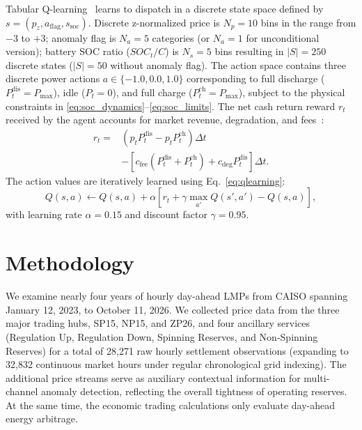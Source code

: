 \documentclass[journal]{IEEEtran}
\begin{document}
Tabular Q-learning~\cite{Sutton_RL} learns to dispatch in a discrete state space defined by $s=(p_z, a_{\text{flag}}, s_{\text{soc}})$. Discrete z-normalized price is $N_p=10$ bins in the range from $-3$ to $+3$; anomaly flag is $N_a=5$ categories (or $N_a=1$ for unconditional version); battery SOC ratio ($SOC_t/C$) is $N_s=5$ bins resulting in $|S|=250$ discrete states ($|S|=50$ without anomaly flag). The action space contains three discrete power actions $a \in \{-1.0, 0.0, 1.0\}$ corresponding to full discharge ($P_t^{\text{dis}}=P_{\max}$), idle ($P_t=0$), and full charge ($P_t^{\text{ch}}=P_{\max}$), subject to the physical constraints in \eqref{eq:soc_dynamics}--\eqref{eq:soc_limits}. The net cash return reward $r_t$ received by the agent accounts for market revenue, degradation, and fees~\cite{Xu_BESS_Degradation}:
\begin{align}
    r_t ={}& \left( p_t P_t^{\text{dis}} - p_t P_t^{\text{ch}} \right) \Delta t \nonumber \\
    &- \left[ c_{\text{fee}} \left( P_t^{\text{dis}} + P_t^{\text{ch}} \right) + c_{\text{deg}} P_t^{\text{dis}} \right] \Delta t.
    \label{eq:reward}
    \end{align}
    The action values are iteratively learned using Eq.~\eqref{eq:qlearning}:
    \begin{equation}
    Q(s,a) \leftarrow Q(s,a) + \alpha \left[r_t + \gamma \max_{a'} Q(s',a') - Q(s,a)\right],
    \label{eq:qlearning}
    \end{equation}
with learning rate $\alpha=0.15$ and discount factor $\gamma=0.95$.

\section{Methodology}
\label{sec:methodology}

We examine nearly four years of hourly day-ahead LMPs from CAISO spanning January 12, 2023, to October 11, 2026. We collected price data from the three major trading hubs, SP15, NP15, and ZP26, and four ancillary services (Regulation Up, Regulation Down, Spinning Reserves, and Non-Spinning Reserves) for a total of 28,271 raw hourly settlement observations (expanding to 32,832 continuous market hours under regular chronological grid indexing). The additional price streams serve as auxiliary contextual information for multi-channel anomaly detection, reflecting the overall tightness of operating reserves. At the same time, the economic trading calculations only evaluate day-ahead energy arbitrage. 
\end{document}
